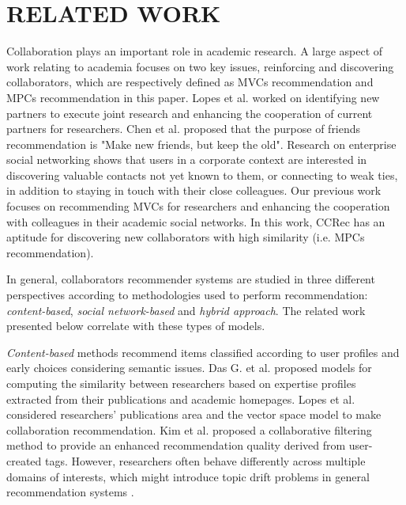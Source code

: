 \documentclass[review]{elsarticle}
\begin{document}
\section{RELATED WORK}
Collaboration plays an important role in academic research. A large aspect of work relating to academia focuses on two key issues, reinforcing and discovering collaborators, which are respectively defined as MVCs recommendation and MPCs recommendation in this paper. Lopes et al. \cite{lopes2010collaboration} worked on identifying new partners to execute joint research and enhancing the cooperation of current partners for researchers. Chen et al. \cite{chen2009make} proposed that the purpose of friends recommendation is "Make new friends, but keep the old". Research on enterprise social networking \cite{dimicco2008motivations} shows that users in a corporate context are interested in discovering valuable contacts not yet known to them, or connecting to weak ties, in addition to staying in touch with their close colleagues. Our previous work \cite{li2014acrec} focuses on recommending MVCs for researchers and enhancing the cooperation with colleagues in their academic social networks. In this work, CCRec has an aptitude for discovering new collaborators with high similarity (i.e. MPCs recommendation).

In general, collaborators recommender systems are studied in three different perspectives according to methodologies used to perform recommendation: \emph{content-based}, \emph{social network-based} and \emph{hybrid approach}. The related work presented below correlate with these types of models.

\emph{Content-based} methods recommend items classified according to user profiles and early choices considering semantic issues. Das G. et al. \cite{gollapalli2012similar} proposed models for computing the similarity between researchers based on expertise profiles extracted from their publications and academic homepages. Lopes et al. \cite{lopes2010collaboration} considered researchers' publications area and the vector space model to make collaboration recommendation. Kim et al. \cite{kim2010collaborative} proposed a collaborative filtering method to provide an enhanced recommendation quality derived from user-created tags. However, researchers often behave differently across multiple domains of interests, which might introduce topic drift problems in general recommendation systems \cite{tang2012cross}.
\end{document}
